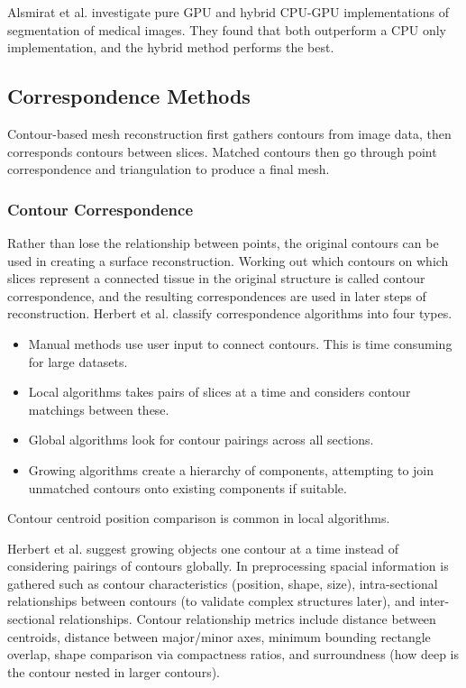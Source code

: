 \documentclass[11p, titlepage]{article}
\begin{document}
Alsmirat et al. \cite{alsmirat2017accelerating} investigate pure GPU and hybrid CPU-GPU implementations of segmentation of medical images. They found that both outperform a CPU only implementation, and the hybrid method performs the best.

\subsection{Correspondence Methods}

Contour-based mesh reconstruction first gathers contours from image data, then corresponds contours between slices. Matched contours then go through point correspondence and triangulation to produce a final mesh.

\subsubsection{Contour Correspondence}

Rather than lose the relationship between points, the original contours can be used in creating a surface reconstruction. Working out which contours on which slices represent a connected tissue in the original structure is called contour correspondence, and the resulting correspondences are used in later steps of reconstruction.
\newline
\linebreak
Herbert et al. \cite{herbert2001contour} classify correspondence algorithms into four types. \begin{itemize}
\item Manual methods use user input to connect contours. This is time consuming for large datasets.
\item Local algorithms takes pairs of slices at a time and considers contour matchings between these.
\item Global algorithms look for contour pairings across all sections.
\item Growing algorithms create a hierarchy of components, attempting to join unmatched contours onto existing components if suitable.
\end{itemize}

Contour centroid position comparison is common in local algorithms.

Herbert et al. \cite{herbert2001contour} suggest growing objects one contour at a time instead of considering pairings of contours globally. In preprocessing spacial information is gathered such as contour characteristics (position, shape, size), intra-sectional relationships between contours (to validate complex structures later), and inter-sectional relationships. Contour relationship metrics include distance between centroids, distance between major/minor axes, minimum bounding rectangle overlap, shape comparison via compactness ratios, and surroundness (how deep is the contour nested in larger contours).
\end{document}
